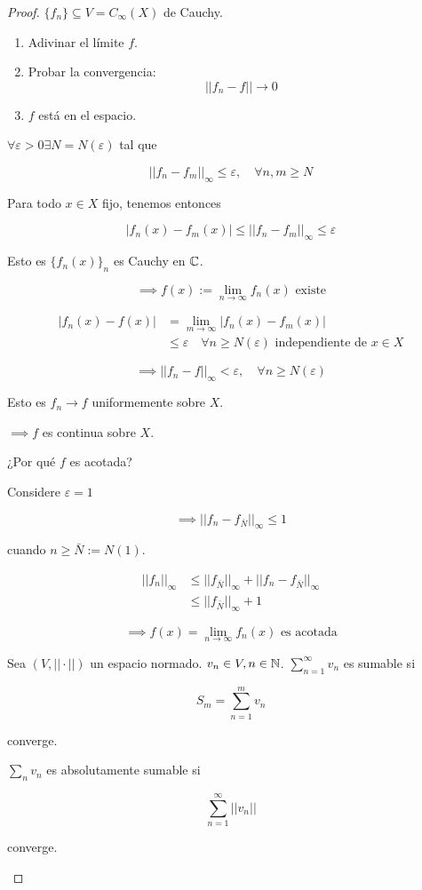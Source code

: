 \begin{proof}
    $\{f_n\}\subseteq V=C_\infty(X)$ de Cauchy.

    \begin{enumerate}
        \item Adivinar el límite $f$.
        \item Probar la convergencia:
        \[||f_n-f||\to 0\]
        \item $f$ está en el espacio.
    \end{enumerate}

    $\forall \varepsilon>0\exists N=N(\varepsilon)$ tal que

    \[||f_n-f_m||_\infty\leq \varepsilon,\quad \forall n,m\geq N\]

    Para todo $x\in X$ fijo, tenemos entonces 

    \[|f_n(x)-f_m(x)|\leq ||f_n-f_m||_\infty\leq \varepsilon\]

    Esto es $\{f_n(x)\}_n$ es Cauchy en $\mathbb{C}$.

    \[\implies f(x):=\lim_{n\to\infty} f_n(x) \text{ existe}\]

    \begin{align*}|f_n(x)-f(x)|&=\lim_{m\to\infty} |f_n(x)-f_m(x)|\\
    &\leq \varepsilon \quad \forall n\geq N(\varepsilon) \text{ independiente de }x\in X
\end{align*}

    \[\implies ||f_n-f||_\infty<\varepsilon,\quad \forall n\geq N(\varepsilon)\]

    Esto es $f_n\to f$ uniformemente sobre $X$.

    $\implies f$ es continua sobre $X$. 

    ¿Por qué $f$ es acotada?

    Considere $\varepsilon=1$

    \[\implies ||f_n-f_{\bar N}||_\infty \leq 1\]

    cuando $n\geq \bar N:=N(1)$.

    \begin{align*}||f_n||_\infty &\leq ||f_{\bar N}||_\infty + ||f_n-f_{\bar N}||_\infty\\
    &\leq ||f_{\bar N}||_\infty +1\end{align*}

    \[\implies f(x)=\lim_{n\to\infty} f_n(x)\text{ es acotada}\]

    \begin{fdefinition}
        Sea $(V,||\cdot||)$ un espacio normado. $v_n\in V,n\in\mathbb{N}$. $\displaystyle\sum_{n=1}^\infty v_n$ es \color{red} sumable \color{black} si

        \[S_m=\sum_{n=1}^m v_n\]

        converge.

        $\displaystyle\sum_{n} v_n$ es \color{red} absolutamente sumable \color{black} si 

        \[\sum_{n=1}^\infty ||v_n||\]

        converge.
    \end{fdefinition}
\end{proof}

